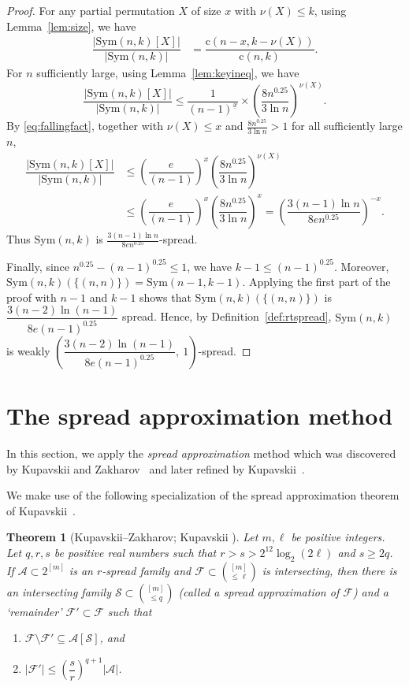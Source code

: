 \documentclass{amsart}
\newtheorem{thm}{Theorem}[section]
\newcommand{\cy}{\nu}
\newcommand{\mcal}{\mathcal}
\newcommand{\sym}{\mathrm{Sym}}
\newcommand{\st}{\mathrm{c}}
\newcommand{\ff}[1]{^{\underline{#1}}}
\begin{document}
\begin{proof}
For any partial permutation $X$ of size $x$ with $\cy(X)\leq k$, using Lemma~\ref{lem:size}, we have 
\begin{align*}
\dfrac{|\sym(n,k)[X]|}{|\sym(n,k)|} &= \dfrac{\st(n-x, k-\cy(X))}{\st(n,k)}.
\end{align*} 
For $n$ sufficiently large, using Lemma~\ref{lem:keyineq}, we have
\[\dfrac{|\sym(n,k)[X]|}{|\sym(n,k)|}\leq \dfrac{1}{(n-1)\ff{x}} \times \left(\dfrac{8n^{0.25}}{3\ln n}\right)^{\cy(X)}.\] 
By \eqref{eq:fallingfact}, together with $\cy(X)\leq x$ and $\frac{8n^{0.25}}{3\ln n}>1$ for all sufficiently large $n$,
\begin{align*}
\dfrac{|\sym(n,k)[X]|}{|\sym(n,k)|} & \leq \left(\dfrac{e}{(n-1)} \right)^{x} \left(\dfrac{8n^{0.25}}{3\ln n}\right)^{\cy(X)} \\
&\leq \left(\dfrac{e}{(n-1)} \right)^{x} \left(\dfrac{8n^{0.25}}{3\ln n}\right)^{x}= \left(\dfrac{3(n-1)\ln n}{8e n^{0.25}} \right)^{-x}.
\end{align*}
Thus $\sym(n,k)$ is $\frac{3(n-1)\ln n}{8e n^{0.25}}$-spread.

Finally, since $n^{0.25}-(n-1)^{0.25} \leq 1$, we have $k-1\leq (n-1)^{0.25}$. Moreover, $\sym(n,k)(\{(n,n)\})=\sym(n-1,k-1)$. Applying the first part of the proof with $n-1$ and $k-1$ shows that
$\sym(n,k)(\{(n,n)\})$ is $\dfrac{3(n-2)\ln(n-1)}{8e (n-1)^{0.25}}$ spread. Hence, by Definition~\ref{def:rtspread}, $\sym(n,k)$ is weakly $\left(\dfrac{3(n-2)\ln(n-1)}{8e (n-1)^{0.25}},\ 1\right)$-spread.
\end{proof}
\section{The spread approximation method}\label{sec:spreadappx}
In this section, we apply the {\it spread approximation} method which was discovered by Kupavskii and Zakharov~\cite{kupavskii2024spread} and later refined by Kupavskii~\cite{kupavskii2026erd}.

We make use of the following specialization of the spread approximation theorem  of Kupavskii~\cite[Theorem 13]{kupavskii2026erd}.

\begin{thm}[Kupavskii--Zakharov; Kupavskii \cite{kupavskii2024spread, kupavskii2026erd}]\label{thm:spreadapproximation}
Let $m,\ell$ be positive integers. Let $q,r,s$ be positive real numbers such that $r>s>2^{12}\log_{2}(2\ell)$ and $s\geq 2q$. If $\mcal{A} \subset 2^{[m]}$ is an $r$-spread family and $\mcal{F} \subset \binom{[m]}{\leq \ell}$ is intersecting, then there is an intersecting family $\mcal{S} \subset \binom{[m]}{\leq q}$ (called a spread approximation of $\mcal{F}$) and a `remainder' $\mcal{F}'\subset \mcal{F}$ such that
\begin{enumerate}
\item $\mcal{F}\setminus \mcal{F}' \subseteq \mcal{A}[\mcal{S}]$, and
\item $|\mcal{F}'| \leq \left(\dfrac{s}{r} \right)^{q+1}|\mcal{A}|$.
\end{enumerate}
\end{thm}
\end{document}
